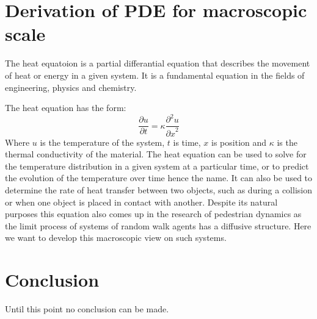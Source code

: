 \newpage
\section{Derivation of PDE for macroscopic scale}
The heat equatoion is a partial differantial equation that describes the movement of heat or energy in a given system.
It is a fundamental equation in the fields of engineering, physics and chemistry.

The heat equation has the form: 
\begin{equation}
\frac{\partial u}{\partial t} = \kappa \frac{{\partial}^2u}{{\partial x}^2}
\end{equation}
Where $u$ is the temperature of the system, $t$ is time, $x$ is position and $\kappa$ is the thermal conductivity of the material.
The heat equation can be used to solve for the temperature distribution in a given system at a particular time, or to predict the evolution of the temperature over time hence the name. It can also be used to determine the rate of heat transfer between two objects, such as during a collision or when one object is placed in contact with another.
Despite its natural purposes this equation also comes up in the research of pedestrian dynamics as the limit process of systems of random walk agents has a diffusive structure. Here we want to develop this macroscopic view on such systems.


\newpage
\section{Conclusion}
Until this point no conclusion can be made.

\cite*{kirchner2003friction}

\newpage





